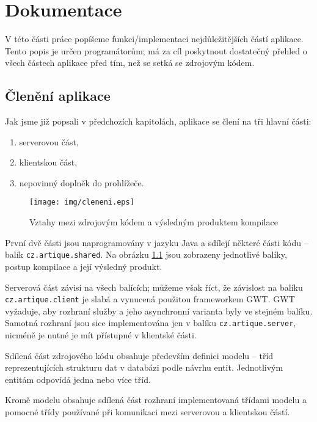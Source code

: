 \chapter{Dokumentace}

V této části práce popíšeme funkci/implementaci nejdůležitějších částí aplikace.
Tento popis je určen programátorům; má za cíl poskytnout dostatečný přehled o všech částech aplikace před tím, než se setká se zdrojovým kódem.

\section{Členění aplikace}

Jak jsme již popsali v předchozích kapitolách, aplikace se člení na tři hlavní části:
\begin{enumerate}
	\item serverovou část,
	\item klientskou část,
	\item nepovinný doplněk do prohlížeče.
\end{enumerate}

\begin{figure}
    \centering
    \texttt{[image: img/cleneni.eps]}
    \caption{Vztahy mezi zdrojovým kódem a výsledným produktem kompilace}
    \label{fig:cleneni}
\end{figure}

První dvě části jsou naprogramovány v jazyku Java a sdílejí některé části kódu -- balík \verb|cz.artique.shared|.
Na obrázku \ref{fig:cleneni} jsou zobrazeny jednotlivé balíky, postup kompilace a její výsledný produkt.

Serverová část závisí na všech balících; můžeme však říct, že závislost na balíku \verb|cz.artique.client| je slabá a vynucená použitou frameworkem GWT.
GWT vyžaduje, aby rozhraní služby a jeho asynchronní varianta byly ve stejném balíku.
Samotná rozhraní jsou sice implementována jen v balíku \verb|cz.artique.server|, nicméně je nutné je mít přístupné v klientské části.

Sdílená část zdrojového kódu obsahuje především definici modelu -- tříd reprezentujících strukturu dat v databázi podle návrhu entit.
Jednotlivým entitám odpovídá jedna nebo více tříd.

Kromě modelu obsahuje sdílená část rozhraní implementovaná třídami modelu a pomocné třídy používané při komunikaci mezi serverovou a klientskou částí.

\bigskip

